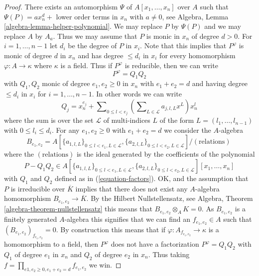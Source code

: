 \begin{proof}
There exists an automorphism $\Psi$ of $A[x_1, \ldots, x_n]$ over $A$
such that $\Psi(P) = ax_n^d +$ lower order terms in $x_n$ with
$a \not = 0$, see
Algebra, Lemma \ref{algebra-lemma-helper-polynomial}.
We may replace $P$ by $\Psi(P)$ and we may replace $A$ by $A_a$.
Thus we may assume that $P$ is monic in $x_n$ of degree $d > 0$.
For $i = 1, \ldots, n - 1$ let $d_i$ be the degree of $P$ in $x_i$.
Note that this implies that $P^\varphi$ is monic of degree $d$ in $x_n$
and has degree $\leq d_i$ in $x_i$ for every homomorphism
$\varphi : A \to \kappa$ where $\kappa$ is a field.
Thus if $P^\varphi$ is reducible, then we can write
$$
P^\varphi = Q_1 Q_2
$$
with $Q_1, Q_2$ monic of degree $e_1, e_2 \geq 0$ in $x_n$ with
$e_1 + e_2 = d$ and having degree $\leq d_i$ in $x_i$ for
$i = 1, \ldots, n - 1$. In other words we can write
\begin{equation}
\label{equation-factors}
Q_j = x_n^{e_j} + \sum\nolimits_{0 \leq l < e_j}
\left( \sum\nolimits_{L \in \mathcal{L}} a_{j, l, L} x^L \right) x_n^l
\end{equation}
where the sum is over the set $\mathcal{L}$ of multi-indices $L$
of the form $L = (l_1, \ldots, l_{n - 1})$ with $0 \leq l_i \leq d_i$.
For any $e_1, e_2 \geq 0$ with $e_1 + e_2 = d$ we consider the $A$-algebra
$$
B_{e_1, e_2} =
A[\{a_{1, l, L}\}_{0 \leq l < e_1, L \in \mathcal{L}},
\{a_{2, l, L}\}_{0 \leq l < e_2, L \in \mathcal{L}}]/(\text{relations})\
$$
where the $(\text{relations})$ is the ideal generated by the coefficients
of the polynomial
$$
P - Q_1Q_2 \in
A[\{a_{1, l, L}\}_{0 \leq l < e_1, L \in \mathcal{L}},
\{a_{2, l, L}\}_{0 \leq l < e_2, L \in \mathcal{L}}][x_1, \ldots, x_n]
$$
with $Q_1$ and $Q_2$ defined as in (\ref{equation-factors}). OK, and
the assumption that $P$ is irreducible over $\overline{K}$ implies that
there does not exist any $A$-algebra homomorphism
$B_{e_1, e_2} \to \overline{K}$. By the Hilbert Nullstellensatz, see
Algebra, Theorem \ref{algebra-theorem-nullstellensatz}
this means that $B_{e_1, e_2} \otimes_A K = 0$.
As $B_{e_1, e_2}$ is a finitely generated $A$-algebra this signifies that
we can find an $f_{e_1, e_2} \in A$ such that
$(B_{e_1, e_2})_{f_{e_1, e_2}} = 0$. By construction this means that
if $\varphi : A_{f_{e_1, e_2}} \to \kappa$ is a homomorphism to a field,
then $P^\varphi$ does not have a factorization $P^\varphi = Q_1 Q_2$
with $Q_1$ of degree $e_1$ in $x_n$ and $Q_2$ of degree $e_2$ in $x_n$.
Thus taking
$f = \prod_{e1, e_2 \geq 0, e_1 + e_2 = d} f_{e_1, e_2}$ we win.
\end{proof}

